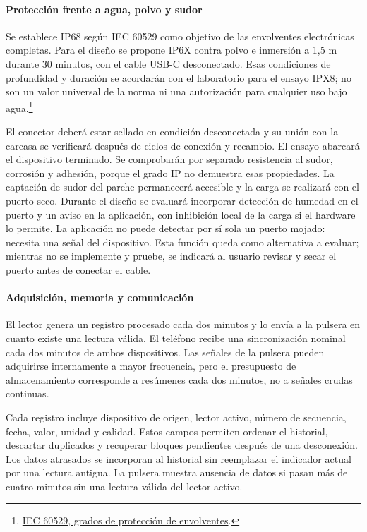 \paragraph{Protección frente a agua, polvo y sudor}
Se establece IP68 según IEC 60529 como objetivo de las envolventes electrónicas completas. Para el diseño se propone IP6X contra polvo e inmersión a 1,5 m durante 30 minutos, con el cable USB-C desconectado. Esas condiciones de profundidad y duración se acordarán con el laboratorio para el ensayo IPX8; no son un valor universal de la norma ni una autorización para cualquier uso bajo agua.\footnote{\href{https://webstore.iec.ch/en/publication/2452}{IEC 60529, grados de protección de envolventes}.}

El conector deberá estar sellado en condición desconectada y su unión con la carcasa se verificará después de ciclos de conexión y recambio. El ensayo abarcará el dispositivo terminado. Se comprobarán por separado resistencia al sudor, corrosión y adhesión, porque el grado IP no demuestra esas propiedades. La captación de sudor del parche permanecerá accesible y la carga se realizará con el puerto seco. Durante el diseño se evaluará incorporar detección de humedad en el puerto y un aviso en la aplicación, con inhibición local de la carga si el hardware lo permite. La aplicación no puede detectar por sí sola un puerto mojado: necesita una señal del dispositivo. Esta función queda como alternativa a evaluar; mientras no se implemente y pruebe, se indicará al usuario revisar y secar el puerto antes de conectar el cable.

\paragraph{Adquisición, memoria y comunicación}
El lector genera un registro procesado cada dos minutos y lo envía a la pulsera en cuanto existe una lectura válida. El teléfono recibe una sincronización nominal cada dos minutos de ambos dispositivos. Las señales de la pulsera pueden adquirirse internamente a mayor frecuencia, pero el presupuesto de almacenamiento corresponde a resúmenes cada dos minutos, no a señales crudas continuas.

Cada registro incluye dispositivo de origen, lector activo, número de secuencia, fecha, valor, unidad y calidad. Estos campos permiten ordenar el historial, descartar duplicados y recuperar bloques pendientes después de una desconexión. Los datos atrasados se incorporan al historial sin reemplazar el indicador actual por una lectura antigua. La pulsera muestra ausencia de datos si pasan más de cuatro minutos sin una lectura válida del lector activo.

